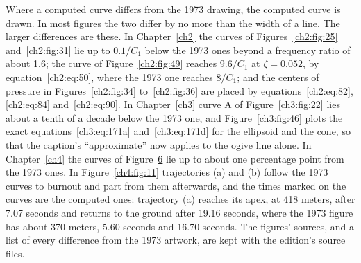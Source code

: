 Where a computed curve differs from the 1973 drawing, the computed curve is drawn. In most figures
the two differ by no more than the width of a line. The larger differences are these. In
Chapter~\ref{ch2} the curves of Figures~\ref{ch2:fig:25} and~\ref{ch2:fig:31} lie up to $0.1/C_1$
below the 1973 ones beyond a frequency ratio of about 1.6; the curve of Figure~\ref{ch2:fig:49}
reaches $9.6/C_1$ at $\zeta = 0.052$, by equation~\eqref{ch2:eq:50}, where the 1973 one reaches
$8/C_1$; and the centers of pressure in Figures~\ref{ch2:fig:34} to~\ref{ch2:fig:36} are placed by
equations~\eqref{ch2:eq:82}, \eqref{ch2:eq:84} and~\eqref{ch2:eq:90}. In Chapter~\ref{ch3} curve A
of Figure~\ref{ch3:fig:22} lies about a tenth of a decade below the 1973 one, and
Figure~\ref{ch3:fig:46} plots the exact equations~\eqref{ch3:eq:171a} and~\eqref{ch3:eq:171d} for
the ellipsoid and the cone, so that the caption's ``approximate'' now applies to the ogive line
alone. In Chapter~\ref{ch4} the curves of Figure~\hyperref[ch4:fig:6a]{6} lie up to about one percentage
point from the 1973 ones. In Figure~\ref{ch4:fig:11} trajectories (a) and (b) follow the 1973
curves to burnout and part from them afterwards, and the times marked on the curves are the
computed ones: trajectory (a) reaches its apex, at 418 meters, after 7.07 seconds and returns to
the ground after 19.16 seconds, where the 1973 figure has about 370 meters, 5.60 seconds and
16.70 seconds. The figures' sources, and a list of every difference from the 1973 artwork, are kept
with the edition's source files.
